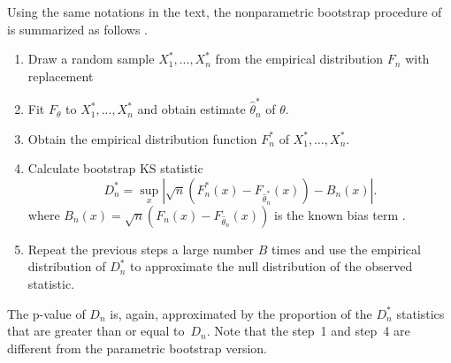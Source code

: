 \documentclass[12pt, letterpaper, titlepage]{article}
\begin{document}
Using the same notations in the text, the nonparametric bootstrap procedure of
\citet{babu2004goodness} is summarized as follows
\citep{babu2004goodness}.
\begin{enumerate}
\item
  Draw a random sample $X_1^*,...,X_n^*$ from the empirical distribution $F_n$
  with replacement
\item
  Fit $F_\theta$ to $X_1^*,...,X_n^*$ and obtain estimate 
	$\hat\theta_n^*$ of $\theta$.
\item
  Obtain the empirical distribution function $F_n^*$ of
  $X_1^*, \ldots,  X_n^*$. 
\item
  Calculate bootstrap KS statistic
  \[
    D_n^* = \sup_x | \sqrt{n}\left(F_n^* (x)- F_{\hat\theta_n^*}(x)\right) - B_n(x) |.
  \]
  where $B_{n}(x) = \sqrt{n}(F_{n}(x) - F_{\hat\theta_n}(x))$ is the known
  bias term \citep{babu2004goodness}.
\item
  Repeat the previous steps a large number $B$ times and use the empirical
  distribution of $D_n^*$ to approximate the null distribution of the observed
  statistic. 
\end{enumerate}
The p-value of $D_n$ is, again, approximated by the proportion of the $D_n^*$
statistics that are greater than or equal to~$D_n$. Note that the step~1 and
step~4 are different from the parametric bootstrap version.



\end{document}

